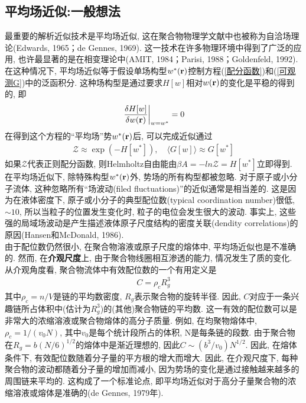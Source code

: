 \subsection{平均场近似:一般想法}
最重要的解析近似技术是平均场近似, 这在聚合物物理学文献中也被称为自洽场理论(Edwards, 1965；de Gennes, 1969). 这一技术在许多物理环境中得到了广泛的应用, 也许最显著的是在相变理论中(AMIT, 1984；Parisi, 1988；Goldenfeld, 1992). 在这种情况下, 平均场近似等于假设单场构型$w^*(\mathbf{r})$控制方程(\ref{配分函数})和(\ref{可观测G})中的泛函积分. 这种场构型是通过要求$H[w]$相对$w(\mathbf{r})$的变化是平稳的得到的, 即\\
\begin{gather}
	\left. \frac{\delta H[w]}{\delta w(\mathbf{r})}\right|_{w=w^*} =0 \label{H[w]相对w(r)的变化}
\end{gather}
在得到这个方程的“平均场”势$w^*(\mathbf{r})$后, 可以完成近似通过\\
\begin{gather}
	\mathcal{Z} \approx \exp(-H[w^*]),\quad \langle G[w]\rangle \approx G[w^*]
\end{gather}
如果$\mathcal{Z}$代表正则配分函数, 则Helmholtz自由能由$\beta A = -ln\mathcal{Z} = H[w^*]$立即得到. \\

在平均场近似下, 除特殊构型$w^*(\mathbf{r})$外, 势场的所有构型都被忽略. 对于原子或小分子流体, 这种忽略所有“场波动(filed fluctuations)”的近似通常是相当差的. 这是因为在液体密度下, 原子或小分子的典型配位数(typical coordination number)很低, $\sim 10$, 所以当粒子的位置发生变化时, 粒子的电位会发生很大的波动. 事实上, 这些强的局域场波动是产生描述液体原子尺度结构的密度关联(dendity correlations)的原因(Hansen和McDonald, 1986). \\

由于配位数仍然很小, 在聚合物溶液或原子尺度的熔体中, 平均场近似也是不准确的. 然而, 在\textbf{介观尺度}上, 由于聚合物线圈相互渗透的能力, 情况发生了质的变化. 从介观角度看, 聚合物流体中有效配位数的一个有用定义是\\
\begin{gather}
	C=\rho_c R_g^3
\end{gather}
其中$\rho_c=n/V$是链的平均数密度, $R_g$表示聚合物的旋转半径. 因此, $C$对应于一条兴趣链所占体积中(估计为$R_g^3$)的(其他)聚合物链的平均数. 这一有效的配位数可以是非常大的浓缩溶液或聚合物熔体的高分子质量. 例如, 在均聚物熔体中, $\rho_c=1/(v_0N)$, 其中$v_0$是每个统计段所占的体积, N是每条链的段数. 由于聚合物在$R_g=b(N/6)^{1/2}$的熔体中是渐近理想的, 因此$C\sim (b^3/v_0)N^{1/2}$. 因此, 在熔体条件下, 有效配位数随着分子量的平方根的增大而增大. 因此, 在介观尺度下, 每种聚合物的波动都随着分子量的增加而减小, 因为势场的变化是通过接触越来越多的周围链来平均的. 这构成了一个标准论点, 即平均场近似对于高分子量聚合物的浓缩溶液或熔体是准确的(de Gennes, 1979年). \\


